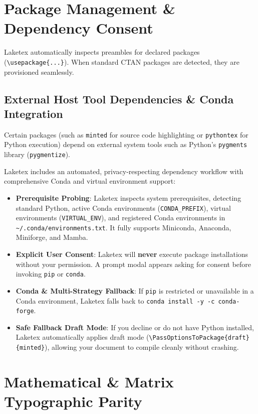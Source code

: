 \documentclass[11pt, a4paper]{article}
\begin{document}
\section{Package Management \& Dependency Consent}

Laketex automatically inspects preambles for declared packages (\texttt{\textbackslash usepackage\{...\}}). When standard CTAN packages are detected, they are provisioned seamlessly.

\subsection{External Host Tool Dependencies \& Conda Integration}
Certain packages (such as \texttt{minted} for source code highlighting or \texttt{pythontex} for Python execution) depend on external system tools such as Python's \texttt{pygments} library (\texttt{pygmentize}).

Laketex includes an automated, privacy-respecting dependency workflow with comprehensive Conda and virtual environment support:
\begin{itemize}
    \item \textbf{Prerequisite Probing}: Laketex inspects system prerequisites, detecting standard Python, active Conda environments (\texttt{CONDA\_PREFIX}), virtual environments (\texttt{VIRTUAL\_ENV}), and registered Conda environments in \texttt{\~{}/.conda/environments.txt}. It fully supports Miniconda, Anaconda, Miniforge, and Mamba.
    \item \textbf{Explicit User Consent}: Laketex will \textbf{never} execute package installations without your permission. A prompt modal appears asking for consent before invoking \texttt{pip} or \texttt{conda}.
    \item \textbf{Conda \& Multi-Strategy Fallback}: If \texttt{pip} is restricted or unavailable in a Conda environment, Laketex falls back to \texttt{conda install -y -c conda-forge}.
    \item \textbf{Safe Fallback Draft Mode}: If you decline or do not have Python installed, Laketex automatically applies draft mode (\texttt{\textbackslash PassOptionsToPackage\{draft\}\{minted\}}), allowing your document to compile cleanly without crashing.
\end{itemize}

\section{Mathematical \& Matrix Typographic Parity}
\end{document}
